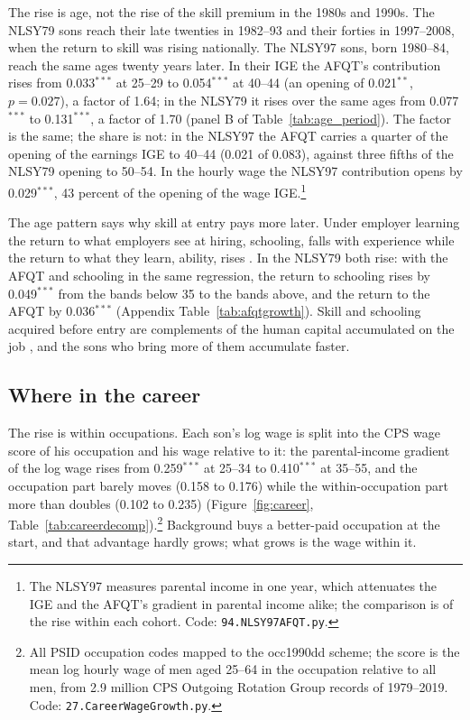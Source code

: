 The rise is age, not the rise of the skill premium in the 1980s and 1990s. The NLSY79 sons reach their late twenties
in 1982--93 and their forties in 1997--2008, when the return to skill was rising nationally. The NLSY97 sons, born
1980--84, reach the same ages twenty years later. In their IGE the AFQT's contribution rises from 0.033$^{***}$ at
25--29 to 0.054$^{***}$ at 40--44 (an opening of 0.021$^{**}$, $p = 0.027$), a factor of 1.64; in the NLSY79 it rises
over the same ages from 0.077$^{***}$ to 0.131$^{***}$, a factor of 1.70 (panel B of Table~\ref{tab:age_period}). The
factor is the same; the share is not: in the NLSY97 the AFQT carries a quarter of the opening of the earnings IGE to
40--44 (0.021 of 0.083), against three fifths of the NLSY79 opening to 50--54. In the hourly wage the NLSY97
contribution opens by 0.029$^{***}$, 43 percent of the opening of the wage IGE.\footnote{The NLSY97
measures parental income in one year, which attenuates the IGE and the AFQT's gradient in parental income alike; the
comparison is of the rise within each cohort. Code: \texttt{94.NLSY97AFQT.py}.}



The age pattern says why skill at entry pays more later. Under employer learning the return to what employers see at
hiring, schooling, falls with experience while the return to what they learn, ability, rises
\citep{altonji2001employer, lange2007speed}. In the NLSY79 both rise: with the AFQT and schooling in the same
regression, the return to schooling rises by 0.049$^{***}$ from the bands below 35 to the bands above, and the return to
the AFQT by 0.036$^{***}$ (Appendix Table~\ref{tab:afqtgrowth}). Skill and schooling acquired before entry are
complements of the human capital accumulated on the job \citep{bhuller2017life}, and the sons who bring more of them
accumulate faster.

\subsection{Where in the career}

The rise is within occupations. Each son's log wage is split into the CPS wage score of his occupation and his wage
relative to it: the parental-income gradient of the log wage rises from 0.259$^{***}$ at 25--34 to 0.410$^{***}$ at
35--55, and the occupation part barely moves (0.158 to 0.176) while the within-occupation part more than doubles (0.102
to 0.235) (Figure~\ref{fig:career}, Table~\ref{tab:careerdecomp}).\footnote{All PSID occupation codes mapped to the
occ1990dd scheme; the score is the mean log hourly wage of men aged 25--64 in the occupation relative to all men, from
2.9 million CPS Outgoing Rotation Group records of 1979--2019. Code: \texttt{27.CareerWageGrowth.py}.} Background
buys a better-paid occupation at the start, and that advantage hardly grows; what grows is the wage within it.

